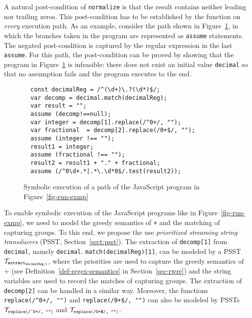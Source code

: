 A natural post-condition of {\tt normalize} is that the result
contains neither leading nor trailing zeros. This post-condition has
to be established by the function on \emph{every} execution path.  As
an example, consider the path shown in Figure~\ref{fig-run-exmp-path},
in which the branches taken in the program are represented as
\texttt{assume} statements. The negated post-condition is captured by
the regular expression in the last \texttt{assume}. For this path, the
post-condition can be proved by showing that the program in
Figure~\ref{fig-run-exmp-path} is infeasible: there does not exist an
initial value {\tt decimal} so that no assumption fails and the
program executes to the end.
\begin{figure}[tb]
\begin{center}
\begin{verbatim}
  const decimalReg = /^(\d+)\.?(\d*)$/;
  var decomp = decimal.match(decimalReg);
  var result = "";
  assume (decomp!==null);
  var integer = decomp[1].replace(/^0+/, "");
  var fractional  = decomp[2].replace(/0+$/, "");
  assume (integer !== ""); 
  result1 = integer;
  assume (fractional !== ""); 
  result2 = result1 + "." + fractional;
  assume (/^0\d+.*|.*\.\d*0$/.test(result2));
\end{verbatim}
\end{center}
\label{fig-run-exmp-path}
\vspace{-3mm}
\caption{Symbolic execution of a path of the JavaScript program in Figure~\ref{fig-run-exmp}}
\end{figure}

To enable symbolic execution of the JavaScript programs like in Figure~\ref{fig-run-exmp}, we need to model the greedy semantics of {\tt +} and the matching of capturing groups. To this end, we propose the use \emph{prioritized streaming string transducers} (PSST, Section~\ref{sect:psst}). The extraction of {\tt decomp[1]} from {\tt decimal}, namely {\tt decimal}. {\tt match(decimalReg)[1]}, can be modeled by a PSST $\mathcal{T}_{\tt extract_{decimalReg,1}}$, where the priorities are used to capture the greedy semantics of $+$ (see Definition~\ref{def-regex-semantics} in Section~\ref{sec-rwre}) and the string variables are used to record the matches of capturing groups. %
The extraction of {\tt decomp[2]} can be handled in a similar way. Moreover, the functions {\tt replace(/\^{}0+/, "")} and {\tt replace(/0+\$/, "")}  can also be modeled by PSSTs $\mathcal{T}_{\scriptsize\tt replace(\mbox{\tt /\^{}0+/, ""})}$ and $\mathcal{T}_{\scriptsize\tt replace(\mbox{\tt /0+\$/, ""})}$.

